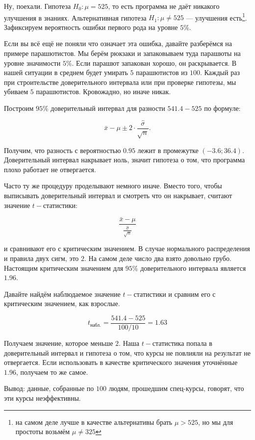\documentclass[12pt, a4paper, oneside]{article}
\theoremstyle{plain} %
\theoremstyle{definition}
\begin{document}
\begin{solution}
Ну, поехали. Гипотеза $H_0:  \mu = 525$, то есть программа не даёт никакого улучшения в знаниях. Альтернативная гипотеза $H_1: \mu \ne 525$ --- улучшения есть\footnote{на самом деле лучше в качестве альтернативы брать $\mu > 525$, но мы для простоты возьмём $\mu \ne 325$}. Зафиксируем вероятность ошибки первого рода на уровне $5\%$.

 Если вы всё ещё не поняли что означает эта ошибка, давайте разберёмся на примере парашютистов. Мы берём рюкзаки и запаковываем туда парашюты на уровне значимости $5\%$. Если парашют запакован хорошо, он раскрывается. В нашей ситуации в среднем будет умирать $5$ парашютистов из $100$. Каждый раз при строительстве доверительного интервала или при проверке гипотезы, мы убиваем $5$ парашютистов. Кровожадно, но иначе никак. 

Построим $95\%$ доверительный интервал для разности $541.4 - 525$ по формуле: 

\[
\bar x  - \mu  \pm  2 \cdot \frac{\hat \sigma}{\sqrt{n}}.
\] 

Получим, что разность с вероятностью $0.95$ лежит в промежутке $(-3.6; 36.4)$. Доверительный интервал накрывает ноль, значит гипотеза о том, что программа плохо работает не отвергается. 

Часто ту же процедуру проделывают немного иначе. Вместо того, чтобы выписывать доверительный интервал и смотреть что он накрывает, считают значение $t-$статистики: 

\[  
\frac{\bar x - \mu}{\frac{\hat \sigma}{\sqrt{n}}}
\]

и сравнивают его с критическим значением. В случае нормального распределения и правила двух сигм, это $2$. На самом деле число два взято довольно грубо. Настоящим критическим значением для $95\%$ доверительного интервала является $1.96$.  

Давайте найдём наблюдаемое значение $t-$статистики и сравним его с критическим значением, как взрослые. 

\[
t_{\text{набл.}}= \frac{541.4 - 525}{100/10} = 1.63
\]

Получаем значение, которое меньше $2$. Наша $t-$статистика попала в доверительный интервал и гипотеза о том, что курсы не повлияли на результат не отвергается. Если использовать в качестве критического значения уточнённые $1.96$, получаем то же самое. 

Вывод: данные, собранные по $100$ людям, прошедшим спец-курсы, говорят, что эти курсы неэффективны. 
\end{solution}
\end{document}
